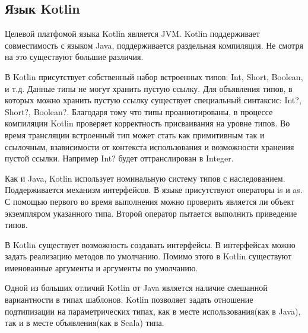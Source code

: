 \subsection{Язык Kotlin}

Целевой платфомой языка Kotlin является JVM. Kotlin поддерживает совместимость с языком Java\cite{kotlin:compatibility}, поддерживается раздельная компиляция. Не смотря на это существуют большие различия.

В Kotlin присутствует собственный набор встроенных типов: Int, Short, Boolean, и т.д. Данные типы не могут хранить пустую ссылку. Для объявления типов, в которых можно хранить пустую ссылку существует специальный синтаксис: Int?, Short?, Boolean?. Благодаря тому что типы проаннотированы, в процессе компиляции Kotlin проверяет корректность присваивания на уровне типов. Во время трансляции встроенный тип может стать как примитивным так и ссылочным, взависимости от контекста использования и возможности хранения пустой ссылки. Например Int? будет оттранслирован в Integer.

Как и Java, Kotlin использует номинальную систему типов с наследованием. Поддерживается механизм интерфейсов. В языке присутствуют операторы is и as. С помощью первого во время выполнения можно проверить является ли объект экземпляром указанного типа. Второй оператор пытается выполнить приведение типов.

В Kotlin существует возможность создавать интерфейсы. В интерфейсах можно задать реализацию методов по умолчанию. Помимо этого в Kotlin существуют именованные аргументы и аргументы по умолчанию.

Одной из больших отличий Kotlin от Java является наличие смешанной вариантности в типах шаблонов. Kotlin позволяет задать отношение подтипизации на параметрических типах, как в месте использования(как в Java), так и в месте объявления(как в Scala) типа.
